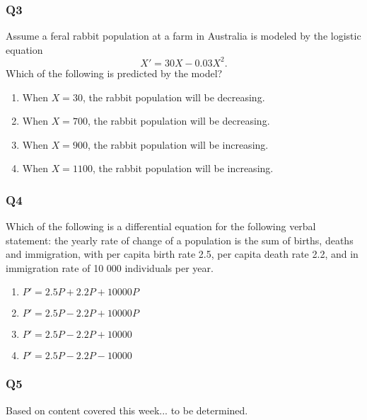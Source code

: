 \documentclass[12pt,a4paper]{article}
\begin{document}
\subsubsection*{Q3}
Assume a feral rabbit population at a farm in Australia is modeled by the logistic equation
\[
	X' = 30X - 0.03X^2.
\]
Which of the following is predicted by the model?

\begin{enumerate}[label=(\alph*)]
\item When $X = 30$, the rabbit population will be decreasing.
\item When $X = 700$, the rabbit population will be decreasing.
\item When $X = 900$, the rabbit population will be increasing.
\item When $X = 1100$, the rabbit population will be increasing.
\end{enumerate}

\subsubsection*{Q4}
Which of the following is a differential equation for the following verbal statement: the yearly rate of change of a population is the sum of births, deaths and immigration, with per capita birth rate 2.5, per capita death rate 2.2, and in immigration rate of 10 000 individuals per year.

\begin{enumerate}[label=(\alph*)]
\item $P' = 2.5P + 2.2P + 10000P$
\item $P' = 2.5P - 2.2P + 10000P$
\item $P' = 2.5P - 2.2P + 10000$
\item $P' = 2.5P - 2.2P - 10000$
\end{enumerate}

\subsubsection*{Q5}
Based on content covered this week... to be determined.
\end{document}

